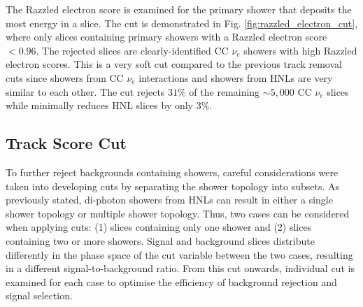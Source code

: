 The Razzled electron score is examined for the primary shower that deposits the most energy in a slice.
The cut is demonstrated in Fig. \ref{fig:razzled_electron_cut}, where only slices containing primary showers with a Razzled electron score $< 0.96$.
The rejected slices are clearly-identified CC $\nu_e$ showers with high Razzled electron scores.
This is a very soft cut compared to the previous track removal cuts since showers from CC $\nu_e$ interactions and showers from HNLs are very similar to each other.
The cut rejects $31\%$ of the remaining $\sim5,000$ CC $\nu_e$ slices while minimally reduces HNL slices by only $3 \%$.

\subsection{Track Score Cut}
\label{sec:trk_score}

To further reject backgrounds containing showers, careful considerations were taken into developing cuts by separating the shower topology into subsets.
As previously stated, di-photon showers from HNLs can result in either a single shower topology or multiple shower topology.
Thus, two cases can be considered when applying cuts: (1) slices containing only one shower and (2) slices containing two or more showers.
Signal and background slices distribute differently in the phase space of the cut variable between the two cases, resulting in a different signal-to-background ratio.
From this cut onwards, individual cut is examined for each case to optimise the efficiency of background rejection and signal selection. 

